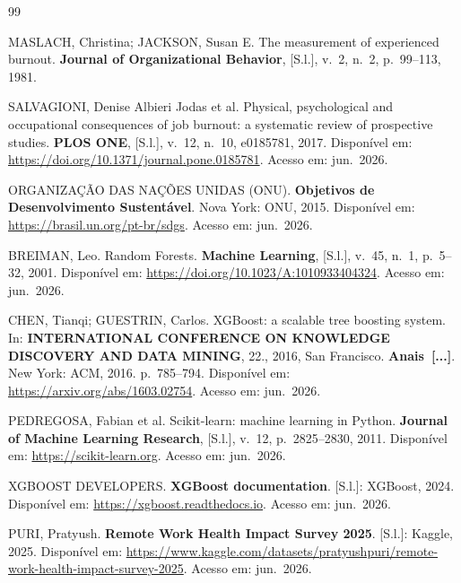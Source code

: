 \documentclass[conference]{IEEEtran}
\begin{document}
\clearpage
\renewcommand{\refname}{REFERÊNCIAS}
\begin{thebibliography}{99}
\setlength{\itemsep}{6pt}

MASLACH, Christina; JACKSON, Susan E\@.
The measurement of experienced burnout.
\textbf{Journal of Organizational Behavior}, [S.l.], v.~2, n.~2,
p.~99--113, 1981.

SALVAGIONI, Denise Albieri Jodas et al.
Physical, psychological and occupational consequences of job burnout:
a systematic review of prospective studies.
\textbf{PLOS ONE}, [S.l.], v.~12, n.~10, e0185781, 2017.
Disponível em: \url{https://doi.org/10.1371/journal.pone.0185781}.
Acesso em: jun.~2026.

ORGANIZAÇÃO DAS NAÇÕES UNIDAS (ONU).
\textbf{Objetivos de Desenvolvimento Sustentável}.
Nova York: ONU, 2015.
Disponível em: \url{https://brasil.un.org/pt-br/sdgs}.
Acesso em: jun.~2026.

BREIMAN, Leo.
Random Forests.
\textbf{Machine Learning}, [S.l.], v.~45, n.~1, p.~5--32, 2001.
Disponível em: \url{https://doi.org/10.1023/A:1010933404324}.
Acesso em: jun.~2026.

CHEN, Tianqi; GUESTRIN, Carlos.
XGBoost: a scalable tree boosting system.
In: \textbf{INTERNATIONAL CONFERENCE ON KNOWLEDGE DISCOVERY AND DATA
	MINING}, 22., 2016, San Francisco.
\textbf{Anais~[...]}. New York: ACM, 2016. p.~785--794.
Disponível em: \url{https://arxiv.org/abs/1603.02754}.
Acesso em: jun.~2026.

PEDREGOSA, Fabian et al.
Scikit-learn: machine learning in Python.
\textbf{Journal of Machine Learning Research}, [S.l.], v.~12,
p.~2825--2830, 2011.
Disponível em: \url{https://scikit-learn.org}.
Acesso em: jun.~2026.

XGBOOST DEVELOPERS.
\textbf{XGBoost documentation}. [S.l.]: XGBoost, 2024.
Disponível em: \url{https://xgboost.readthedocs.io}.
Acesso em: jun.~2026.

PURI, Pratyush.
\textbf{Remote Work Health Impact Survey 2025}. [S.l.]: Kaggle, 2025.
Disponível em:
\url{https://www.kaggle.com/datasets/pratyushpuri/remote-work-health-impact-survey-2025}.
Acesso em: jun.~2026.

\end{thebibliography}
\end{document}
